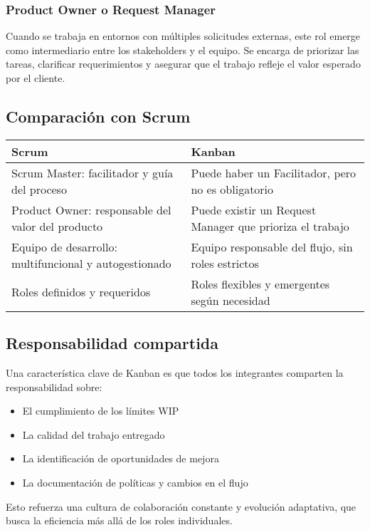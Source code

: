 \subsubsection{Product Owner o Request Manager}

Cuando se trabaja en entornos con múltiples solicitudes externas, este rol emerge como intermediario entre los stakeholders y el equipo. Se encarga de priorizar las tareas, clarificar requerimientos y asegurar que el trabajo refleje el valor esperado por el cliente.

\subsection{Comparación con Scrum}

\begin{longtable}{|p{5cm}|p{5cm}|}
\hline
\textbf{Scrum} & \textbf{Kanban} \\
\hline
Scrum Master: facilitador y guía del proceso & Puede haber un Facilitador, pero no es obligatorio \\
\hline
Product Owner: responsable del valor del producto & Puede existir un Request Manager que prioriza el trabajo \\
\hline
Equipo de desarrollo: multifuncional y autogestionado & Equipo responsable del flujo, sin roles estrictos \\
\hline
Roles definidos y requeridos & Roles flexibles y emergentes según necesidad \\
\hline
\end{longtable}

\subsection{Responsabilidad compartida}

Una característica clave de Kanban es que todos los integrantes comparten la responsabilidad sobre:
\begin{itemize}
    \item El cumplimiento de los límites WIP
    \item La calidad del trabajo entregado
    \item La identificación de oportunidades de mejora
    \item La documentación de políticas y cambios en el flujo
\end{itemize}

Esto refuerza una cultura de colaboración constante y evolución adaptativa, que busca la eficiencia más allá de los roles individuales.

